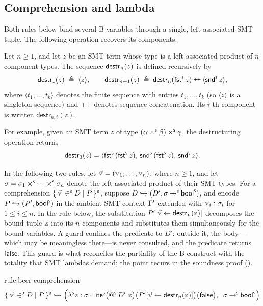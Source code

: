\subsection{Comprehension and lambda}
\label{sec:beer-rules-comprehension}

Both rules below bind several B variables through a single, left-associated SMT tuple.
The following operation recovers its components.
\begin{definition}
  \label{def:beer-tuple-destructuring}
  Let \(n \geq 1\), and let \(z\) be an SMT term whose type is a left-associated product of \(n\) component types.
  The sequence \(\mathsf{destr}_n(z)\) is defined recursively by
  \[
    \mathsf{destr}_1(z) \;\triangleq\; \langle z \rangle,
    \qquad
    \mathsf{destr}_{n+1}(z) \;\triangleq\;
      \mathsf{destr}_n(\mathord{\mathsf{fst}^{\scriptscriptstyle{\mathsf{S}}}}\, z) \mathbin{\texttt{++}} \langle \mathord{\mathsf{snd}^{\scriptscriptstyle{\mathsf{S}}}}\, z \rangle,
  \]
  where \(\langle t_1, \dots, t_k \rangle\) denotes the finite sequence with entries \(t_1, \dots, t_k\) (so \(\langle z \rangle\) is a singleton sequence) and \(\texttt{++}\) denotes sequence concatenation.
  Its \(i\)-th component is written \(\mathsf{destr}_{n,i}(z)\).
\end{definition}

\begin{example}
  For example, given an SMT term \(z\) of type \((\alpha \mathbin{\times^{\scriptscriptstyle{\mathsf{S}}}} \beta) \mathbin{\times^{\scriptscriptstyle{\mathsf{S}}}} \gamma\), the destructuring operation returns
  \[
    \mathsf{destr}_3(z)
    = \langle \mathord{\mathsf{fst}^{\scriptscriptstyle{\mathsf{S}}}}\,(\mathord{\mathsf{fst}^{\scriptscriptstyle{\mathsf{S}}}}\, z),\, \mathord{\mathsf{snd}^{\scriptscriptstyle{\mathsf{S}}}}\,(\mathord{\mathsf{fst}^{\scriptscriptstyle{\mathsf{S}}}}\, z),\, \mathord{\mathsf{snd}^{\scriptscriptstyle{\mathsf{S}}}}\, z \rangle.
  \]
\end{example}

In the following two rules, let \(\vec{\var{v}} = (\var{v}_1, \dots, \var{v}_n)\), where \(n \geq 1\), and let \(\sigma = \sigma_1 \mathbin{\times^{\scriptscriptstyle{\mathsf{S}}}} \cdots \mathbin{\times^{\scriptscriptstyle{\mathsf{S}}}} \sigma_n\) denote the left-associated product of their SMT types.
For a comprehension \(\bcomp{\vec{\var{v}} \inB D}{P}\), suppose \(D \mathrel{\hookrightarrow} (D', \sigma \mathbin{\to^{\scriptscriptstyle{\mathsf{S}}}} \mathsf{bool}^{\scriptscriptstyle{\mathsf{S}}})\), and encode \(P \mathrel{\hookrightarrow} (P', \mathsf{bool}^{\scriptscriptstyle{\mathsf{S}}})\) in the ambient SMT context \(\Gamma^{\scriptscriptstyle{\mathsf{S}}}\) extended with \(\var{v}_i : \sigma_i\) for \(1 \leq i \leq n\).
In the rule below, the substitution \(P'[\vec{\var{v}} \leftarrow \mathsf{destr}_n(\var{z})]\) decomposes the bound tuple \(\var{z}\) into its \(n\) components and substitutes them simultaneously for the bound variables.
A guard confines the predicate to \(D'\): outside it, the body---which may be meaningless there---is never consulted, and the predicate returns \(\mathsf{false}\).
This guard is what reconciles the partiality of the B construct with the totality that SMT lambdas demand; the point recurs in the soundness proof ().
\begin{encrule}[comprehension]{rule:beer-comprehension}
\[
  \bcomp{\vec{\var{v}} \inB D}{P} \encto \Bigl(\lamS \var{z} : \sigma \cdot\; \iteS\bigl(\appS{D'}{\var{z}}\bigr)\bigl(P'[\vec{\var{v}} \leftarrow \mathsf{destr}_n(\var{z})]\bigr)\bigl(\mathsf{false}\bigr),\;\; \sigma \toS \boolS\Bigr)
\]
\end{encrule}

